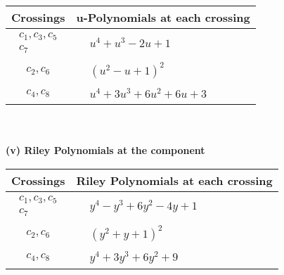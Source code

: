 \documentclass[1p]{elsarticle_modified}
\theoremstyle{definition}
\begin{document}
\begin{tabular}{m{50pt}|m{274pt}}
Crossings & \hspace{64pt}u-Polynomials at each crossing \\
\hline $$\begin{aligned}c_{1},c_{3},c_{5}\\c_{7}\end{aligned}$$&$\begin{aligned}
&u^4+u^3-2 u+1
\end{aligned}$\\
\hline $$\begin{aligned}c_{2},c_{6}\end{aligned}$$&$\begin{aligned}
&(u^2- u+1)^2
\end{aligned}$\\
\hline $$\begin{aligned}c_{4},c_{8}\end{aligned}$$&$\begin{aligned}
&u^4+3 u^3+6 u^2+6 u+3
\end{aligned}$\\
\hline
\end{tabular}\\~\\
\newpage\renewcommand{\arraystretch}{1}
\flushleft \textbf{(v) Riley Polynomials at the component}\newline \\
\begin{tabular}{m{50pt}|m{274pt}}
Crossings & \hspace{64pt}Riley Polynomials at each crossing \\
\hline $$\begin{aligned}c_{1},c_{3},c_{5}\\c_{7}\end{aligned}$$&$\begin{aligned}
&y^4- y^3+6 y^2-4 y+1
\end{aligned}$\\
\hline $$\begin{aligned}c_{2},c_{6}\end{aligned}$$&$\begin{aligned}
&(y^2+y+1)^2
\end{aligned}$\\
\hline $$\begin{aligned}c_{4},c_{8}\end{aligned}$$&$\begin{aligned}
&y^4+3 y^3+6 y^2+9
\end{aligned}$\\
\hline
\end{tabular}\\~\\
\end{document}

